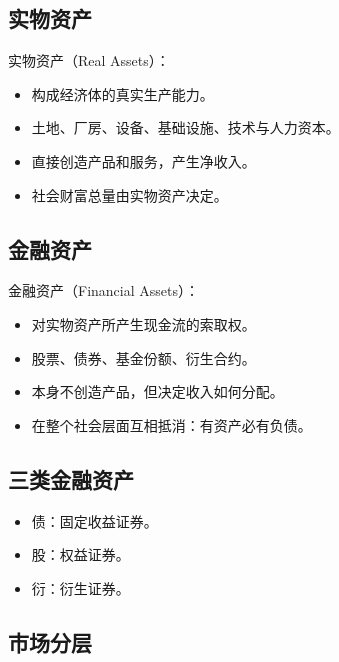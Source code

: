 \documentclass[11pt]{ctexart}
\theoremstyle{definition}
\begin{document}
\subsection*{实物资产}

实物资产（Real Assets）：
\begin{itemize}
    \item 构成经济体的真实生产能力。
    \item 土地、厂房、设备、基础设施、技术与人力资本。
    \item 直接创造产品和服务，产生净收入。
    \item 社会财富总量由实物资产决定。
\end{itemize}

\subsection*{金融资产}

金融资产（Financial Assets）：
\begin{itemize}
    \item 对实物资产所产生现金流的索取权。
    \item 股票、债券、基金份额、衍生合约。
    \item 本身不创造产品，但决定收入如何分配。
    \item 在整个社会层面互相抵消：有资产必有负债。
\end{itemize}

\subsection*{三类金融资产}

\begin{itemize}
    \item 债：固定收益证券。
    \item 股：权益证券。
    \item 衍：衍生证券。
\end{itemize}

\subsection*{市场分层}
\end{document}
